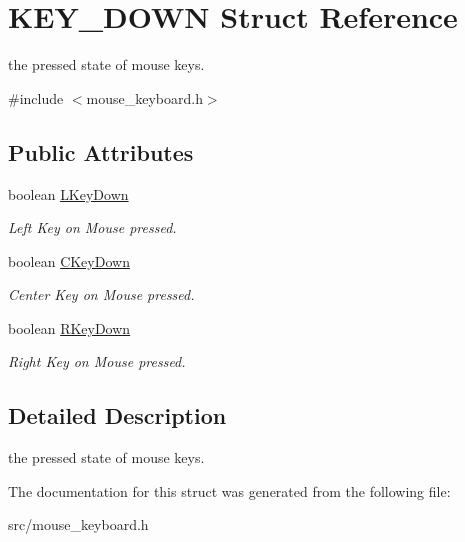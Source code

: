 \hypertarget{struct_k_e_y___d_o_w_n}{}\section{K\+E\+Y\+\_\+\+D\+O\+W\+N Struct Reference}
\label{struct_k_e_y___d_o_w_n}


the pressed state of mouse keys.  




{\ttfamily \#include $<$mouse\+\_\+keyboard.\+h$>$}

\subsection*{Public Attributes}
\begin{DoxyCompactItemize}
\item 
\hypertarget{struct_k_e_y___d_o_w_n_ad7f6cb1b1459d611661269d6d7308a0f}{}boolean \hyperlink{struct_k_e_y___d_o_w_n_ad7f6cb1b1459d611661269d6d7308a0f}{L\+Key\+Down}\label{struct_k_e_y___d_o_w_n_ad7f6cb1b1459d611661269d6d7308a0f}

\begin{DoxyCompactList}\small\item\em Left Key on Mouse pressed. \end{DoxyCompactList}\item 
\hypertarget{struct_k_e_y___d_o_w_n_a34005c82b516e67c0daeee61293b1f45}{}boolean \hyperlink{struct_k_e_y___d_o_w_n_a34005c82b516e67c0daeee61293b1f45}{C\+Key\+Down}\label{struct_k_e_y___d_o_w_n_a34005c82b516e67c0daeee61293b1f45}

\begin{DoxyCompactList}\small\item\em Center Key on Mouse pressed. \end{DoxyCompactList}\item 
\hypertarget{struct_k_e_y___d_o_w_n_ad214936ecc1a21d3c76e1dae55a8fb52}{}boolean \hyperlink{struct_k_e_y___d_o_w_n_ad214936ecc1a21d3c76e1dae55a8fb52}{R\+Key\+Down}\label{struct_k_e_y___d_o_w_n_ad214936ecc1a21d3c76e1dae55a8fb52}

\begin{DoxyCompactList}\small\item\em Right Key on Mouse pressed. \end{DoxyCompactList}\end{DoxyCompactItemize}


\subsection{Detailed Description}
the pressed state of mouse keys. 



The documentation for this struct was generated from the following file\+:\begin{DoxyCompactItemize}
\item 
src/mouse\+\_\+keyboard.\+h\end{DoxyCompactItemize}
